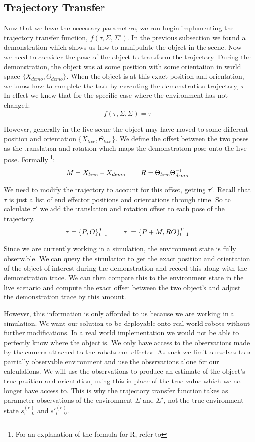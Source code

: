\subsection{Trajectory Transfer}
\label{subsec:alignment}
Now that we have the necessary parameters, we can begin implementing the trajectory transfer function, $f(\tau, \Sigma, \Sigma')$. In the previous subsection we found a demonstration which shows us how to manipulate the object in the scene. Now we need to consider the pose of the object to transform the trajectory. During the demonstration, the object was at some position with some orientation in world space $\{X_{demo}, \Theta_{demo}\}$. When the object is at this exact position and orientation, we know how to complete the task by executing the demonstration trajectory, $\tau$. In effect we know that for the specific case where the environment has not changed:
$$f(\tau, \Sigma, \Sigma) = \tau$$

However, generally in the live scene the object may have moved to some different position and orientation $\{X_{live}, \Theta_{live}\}$. We define the offset between the two poses as the translation and rotation which maps the demonstration pose onto the live pose. Formally \footnote{For an explanation of the formula for R, refer to }:
$$M = X_{live} - X_{demo} \operatorname{\operatorname{\: \: \: \:} \operatorname{\: \: \: \:}} R = \Theta_{live} \Theta_{demo}^{-1}$$ 

We need to modify the trajectory to account for this offset, getting $\tau'$. Recall that $\tau$ is just a list of end effector positions and orientations through time. So to calculate $\tau'$ we add the translation and rotation offset to each pose of the trajectory.
$$\tau = \{P, O\}_{t=1}^T \operatorname{\operatorname{\: \: \: \:} \operatorname{\: \: \: \:}} \tau' = \{P + M, RO\}_{t=1}^T$$

Since we are currently working in a simulation, the environment state is fully observable. We can query the simulation to get the exact position and orientation of the object of interest during the demonstration and record this along with the demonstration trace. We can then compare this to the environment state in the live scenario and compute the exact offset between the two object's and adjust the demonstration trace by this amount.

However, this information is only afforded to us because we are working in a simulation. We want our solution to be deployable onto real world robots without further modifications. In a real world implementation we would not be able to perfectly know where the object is. We only have access to the observations made by the camera attached to the robots end effector. As such we limit ourselves to a partially observable environment and use the observations alone for our calculations. We will use the observations to produce an estimate of the object's true position and orientation, using this in place of the true value which we no longer have access to. This is why the trajectory transfer function takes as parameter observations of the environment $\Sigma$ and $\Sigma'$, not the true environment state $s^{(e)}_{t=0}$ and $s'^{(e)}_{t=0}$.\\

